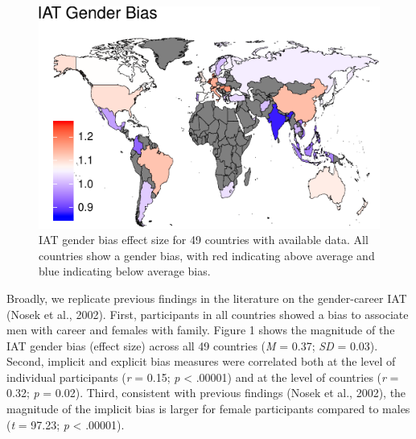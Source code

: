 \documentclass[10pt, letterpaper]{article}
\newenvironment{CodeChunk}{}{}
\begin{document}
\begin{CodeChunk}
\begin{figure}[t]

{\centering \includegraphics{figs/map-1} 

}

\caption[IAT gender bias effect size for 49 countries with available data]{IAT gender bias effect size for 49 countries with available data. All countries show a gender bias, with red indicating above average and blue indicating below average bias.}\label{fig:map}
\end{figure}
\end{CodeChunk}

Broadly, we replicate previous findings in the literature on the
gender-career IAT (Nosek et al., 2002). First, participants in all
countries showed a bias to associate men with career and females with
family. Figure 1 shows the magnitude of the IAT gender bias (effect
size) across all 49 countries (\emph{M} = 0.37; \emph{SD} = 0.03).
Second, implicit and explicit bias measures were correlated both at the
level of individual participants (\emph{r} = 0.15; \emph{p} \textless{}
.00001) and at the level of countries (\emph{r} = 0.32; \emph{p} =
0.02). Third, consistent with previous findings (Nosek et al., 2002),
the magnitude of the implicit bias is larger for female participants
compared to males (\emph{t} = 97.23; \emph{p} \textless{} .00001).
\end{document}
